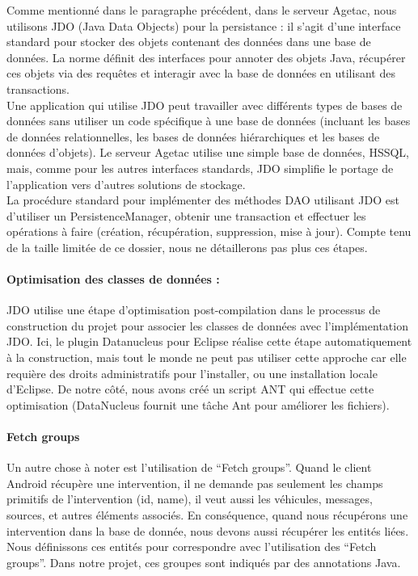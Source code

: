 \documentclass{article}
\begin{document}
Comme mentionné dans le paragraphe précédent, dans le serveur Agetac, nous utilisons JDO (Java Data Objects) pour la persistance : il s’agit d’une interface standard pour stocker des objets contenant des données dans une base de données. La norme définit des interfaces pour annoter des objets Java, récupérer ces objets via des requêtes et interagir avec la base de données en utilisant des transactions.\\


Une application qui utilise JDO peut travailler avec différents types de bases de données sans utiliser un code spécifique à une base de données (incluant les bases de données relationnelles, les bases de données hiérarchiques et les bases de données d’objets). Le serveur Agetac utilise une simple base de données, HSSQL, mais, comme pour les autres interfaces standards, JDO simplifie le portage de l’application vers d’autres solutions de stockage.\\


La procédure standard pour implémenter des méthodes DAO utilisant JDO est d’utiliser un PersistenceManager, obtenir une transaction et effectuer les opérations à faire (création, récupération, suppression, mise à jour). Compte tenu de la taille limitée de ce dossier, nous ne détaillerons pas plus ces étapes.\\


\paragraph{Optimisation des classes de données :}

JDO utilise une étape d’optimisation post-compilation dans le processus de construction du projet pour associer les classes de données avec l’implémentation JDO. Ici, le plugin Datanucleus pour Eclipse réalise cette étape automatiquement à la construction, mais tout le monde ne peut pas utiliser cette approche car elle requière des droits administratifs pour l’installer, ou une installation locale d’Eclipse. De notre côté, nous avons créé un script ANT qui effectue cette optimisation (DataNucleus fournit une tâche Ant pour améliorer les fichiers).\\


\paragraph{Fetch groups}

Un autre chose à noter est l’utilisation de “Fetch groups”. Quand le client Android récupère une intervention, il ne demande pas seulement les champs primitifs de l’intervention (id, name), il veut aussi les véhicules, messages, sources, et autres éléments associés. En conséquence, quand nous récupérons une intervention dans la base de donnée, nous devons aussi récupérer les entités liées. Nous définissons ces entités pour correspondre avec l’utilisation des “Fetch groups”. Dans notre projet, ces groupes sont indiqués par des annotations Java.\\
\end{document}
